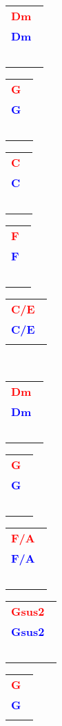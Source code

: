 \documentclass[12pt,a4paper,openany,UTF8]{memoir}
\begin{document}
\begin{tabular}[b]{l}
    \textbf{\textcolor{red}{Dm\ }}\\\textbf{\textcolor{blue}{Dm\ }}\\
    ~\mbox{}\end{tabular}\begin{tabular}[b]{l}
    \textbf{\textcolor{red}{G\ }}\\\textbf{\textcolor{blue}{G\ }}\\
    ~\mbox{}\end{tabular}\begin{tabular}[b]{l}
    \textbf{\textcolor{red}{C\ }}\\\textbf{\textcolor{blue}{C\ }}\\
    ~\mbox{}\end{tabular}\begin{tabular}[b]{l}
    \textbf{\textcolor{red}{F\ }}\\\textbf{\textcolor{blue}{F\ }}\\
    ~\mbox{}\end{tabular}\begin{tabular}[b]{l}
    \textbf{\textcolor{red}{C/E\ }}\\\textbf{\textcolor{blue}{C/E\ }}\\
    \mbox{}\end{tabular}\\
\begin{tabular}[b]{l}
    \textbf{\textcolor{red}{Dm\ }}\\\textbf{\textcolor{blue}{Dm\ }}\\
    ~\mbox{}\end{tabular}\begin{tabular}[b]{l}
    \textbf{\textcolor{red}{G\ }}\\\textbf{\textcolor{blue}{G\ }}\\
    ~\mbox{}\end{tabular}\begin{tabular}[b]{l}
    \textbf{\textcolor{red}{F/A\ }}\\\textbf{\textcolor{blue}{F/A\ }}\\
    ~\mbox{}\end{tabular}\begin{tabular}[b]{l}
    \textbf{\textcolor{red}{Gsus2\ }}\\\textbf{\textcolor{blue}{Gsus2\ }}\\
    ~\mbox{}\end{tabular}\begin{tabular}[b]{l}
    \textbf{\textcolor{red}{G\ }}\\\textbf{\textcolor{blue}{G\ }}\\
    \mbox{}\end{tabular}
\end{document}

